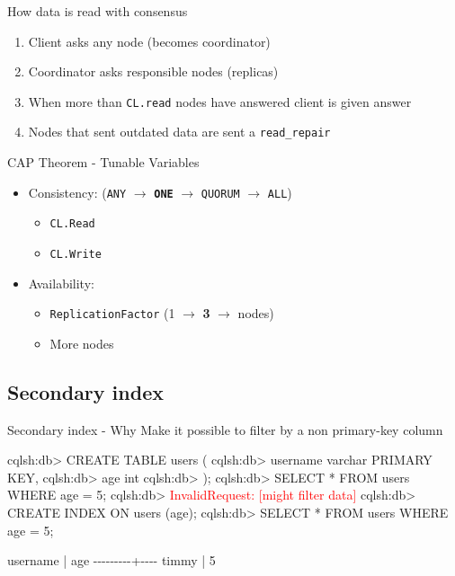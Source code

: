 \documentclass[
  10pt
]{beamer}
\begin{document}
\begin{frame}{How data is read with consensus}
  \begin{enumerate}
    \item<1-> Client asks any node (becomes coordinator)
    \item<2-> Coordinator asks responsible nodes (replicas)
    \item<3-> When more than \lstinline{CL.read} nodes have answered client is given answer
    \item<4-> Nodes that sent outdated data are sent a \lstinline{read_repair}
  \end{enumerate}
\end{frame}

\begin{frame}{CAP Theorem - Tunable Variables}
  \begin{itemize}
    \item<+-> Consistency: (\lstinline{ANY} $\rightarrow$ \textbf{\lstinline{ONE}} $\rightarrow$ \lstinline{QUORUM} $\rightarrow$ \lstinline{ALL})
      \begin{itemize}
        \item \lstinline{CL.Read}
        \item \lstinline{CL.Write}
      \end{itemize}
    \item<+-> Availability:
      \begin{itemize}
        \item \lstinline{ReplicationFactor} (1 $\rightarrow$ \textbf{3} $\rightarrow$ nodes)
        \item More nodes
      \end{itemize}
  \end{itemize}
\end{frame}

\subsection{Secondary index}  %

\begin{frame}[fragile]{Secondary index - Why}
  Make it possible to filter by a non primary-key column
  \begin{semiverbatim}
  cqlsh:db> CREATE TABLE users (
  cqlsh:db>  username varchar PRIMARY KEY,
  cqlsh:db>  age int
  cqlsh:db> );
  cqlsh:db> SELECT * FROM users WHERE age = 5;
  cqlsh:db> \textcolor{red}{InvalidRequest: [might filter data]}
  cqlsh:db> CREATE INDEX ON users (age);
  cqlsh:db> SELECT * FROM users WHERE age = 5;

   username | age
   \--\--\--\--\--\--\--\--\--+\--\--\--\--
      timmy |   5
  \end{semiverbatim}
\end{frame}
\end{document}
